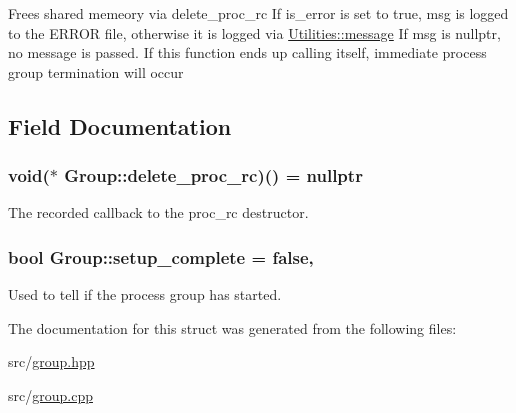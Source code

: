 Frees shared memeory via delete\+\_\+proc\+\_\+rc If is\+\_\+error is set to true, msg is logged to the E\+R\+R\+OR file, otherwise it is logged via \hyperlink{namespace_utilities_a0e46f2da74b1069eb9df671efed9180d}{Utilities\+::message} If msg is nullptr, no message is passed. If this function ends up calling itself, immediate process group termination will occur 

\subsection{Field Documentation}
\subsubsection[{\texorpdfstring{delete\+\_\+proc\+\_\+rc}{delete_proc_rc}}]{\setlength{\rightskip}{0pt plus 5cm}void($\ast$ Group\+::delete\+\_\+proc\+\_\+rc)() = nullptr\hspace{0.3cm}{\ttfamily [static]}}\hypertarget{struct_group_a737564dd9819ea8050f6f3019c550da2}{}\label{struct_group_a737564dd9819ea8050f6f3019c550da2}


The recorded callback to the proc\+\_\+rc destructor. 

\subsubsection[{\texorpdfstring{setup\+\_\+complete}{setup_complete}}]{\setlength{\rightskip}{0pt plus 5cm}bool Group\+::setup\+\_\+complete = false\hspace{0.3cm}{\ttfamily [static]}, {\ttfamily [private]}}\hypertarget{struct_group_a35632ca452cfe09fbf723539cd264f58}{}\label{struct_group_a35632ca452cfe09fbf723539cd264f58}


Used to tell if the process group has started. 



The documentation for this struct was generated from the following files\+:\begin{DoxyCompactItemize}
\item 
src/\hyperlink{group_8hpp}{group.\+hpp}\item 
src/\hyperlink{group_8cpp}{group.\+cpp}\end{DoxyCompactItemize}
